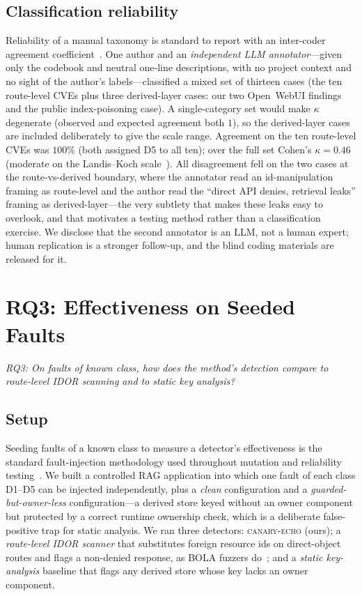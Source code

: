 \IfFileExists{IEEEtran.cls}{\documentclass[conference]{IEEEtran}}{\documentclass[10pt,twocolumn]{article}}
\newcommand{\tool}{\mbox{\textsc{canary-echo}}}
\begin{document}
\subsection{Classification reliability}
Reliability of a manual taxonomy is standard to report with an inter-coder agreement
coefficient~\cite{cohen1960kappa,landis1977kappa}. One author and an \emph{independent LLM
annotator}---given only the codebook and neutral one-line descriptions, with no project context and
no sight of the author's labels---classified a mixed set of thirteen cases (the ten route-level CVEs
plus three derived-layer cases: our two Open~WebUI findings and the public index-poisoning case). A
single-category set would make $\kappa$ degenerate (observed and expected agreement both $1$), so the
derived-layer cases are included deliberately to give the scale range. Agreement on the ten
route-level CVEs was $100\%$ (both assigned D5 to all ten); over the full set Cohen's
$\kappa=0.46$ (moderate on the Landis--Koch scale~\cite{landis1977kappa}). All disagreement fell on
the two cases at the route-vs-derived boundary, where the annotator read an id-manipulation framing
as route-level and the author read the ``direct API denies, retrieval leaks'' framing as
derived-layer---the very subtlety that makes these leaks easy to overlook, and that motivates a
testing method rather than a classification exercise. We disclose that the second annotator is an
LLM, not a human expert; human replication is a stronger follow-up, and the blind coding materials
are released for it.

\section{RQ3: Effectiveness on Seeded Faults}
\label{sec:ea3}
\emph{RQ3: On faults of known class, how does the method's detection compare to route-level IDOR
scanning and to static key analysis?}

\subsection{Setup}
Seeding faults of a known class to measure a detector's effectiveness is the standard fault-injection
methodology used throughout mutation and reliability testing~\cite{jia2011mutation}. We built a
controlled RAG application into which one fault of each class D1--D5 can be injected independently,
plus a \emph{clean} configuration and a \emph{guarded-but-owner-less} configuration---a derived store
keyed without an owner component but protected by a correct runtime ownership check, which is a
deliberate false-positive trap for static analysis. We ran three detectors: \tool{} (ours); a
\emph{route-level IDOR scanner} that substitutes foreign resource ids on direct-object routes and
flags a non-denied response, as BOLA fuzzers
do~\cite{arcuri2025fuzzbola,corradini2023massassign}; and a \emph{static key-analysis} baseline that
flags any derived store whose key lacks an owner component.
\end{document}
